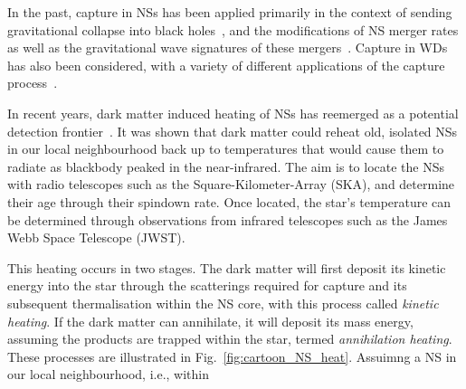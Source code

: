 In the past, capture in NSs has been applied primarily in the context of sending gravitational collapse into black holes~\cite{McDermott:2011jp_ConstraintsScalarAsymmetric,Kouvaris:2011fi_ExcludingLightAsymmetric,Guver:2012ba_may_Capturedarkmatter, Garani:2018kkd_may_NewAnalysisNeutron,Bramante:2013nma_jan_Boundsselfinteractingfermion,Bertoni:2013bsa_dec_DarkMatterThermalization,Bell:2013xk_jun_Realisticneutronstar}, and the modifications of NS merger rates as well as the gravitational wave signatures of these mergers~\cite{Bramante:2017ulk_mar_SearchingDarkMatter, Ellis:2017jgp_jun_SearchDarkMatter, Ellis:2018bkr_jun_DarkMatterEffects,Nelson:2018xtr_jul_Darkhalosneutron}. Capture in WDs has also been considered, with a variety of different applications of the capture process~\cite{Steigerwald:2019efv_dec_DarkMatterThermonuclear, Panotopoulos:2020kuo_jun_Constraintslightdark, McCullough:2010ai_CaptureInelasticDark, Hooper:2010es_InelasticDarkMatter, Bramante:2015cua_sep_Darkmatterignition, Bertone:2007ae_CompactStarsDark}. 

In recent years, dark matter induced heating of NSs has reemerged as a potential detection frontier~\cite{Raj:2017wrv_feb_Neutronstarsdark, Baryakhtar:2017dbj_sep_DarkKineticHeating, Bell:2018pkk_sep_HeatingNeutronStars,Joglekar:2019vzy_sep_Relativisticcapturedark, Acevedo:2019agu_mar_WarmingNuclearPasta, Bell:2019pyc_jun_CaptureLeptophilicDark, Garani:2019fpa_aug_Darkmatterinteractions,Chatterjee:2022dhp_jul_Faintlightold}. It was shown that dark matter could reheat old, isolated NSs in our local neighbourhood back up to temperatures that would cause them to radiate as blackbody peaked in the near-infrared. 
The aim is to locate the NSs with radio telescopes such as the Square-Kilometer-Array (SKA), and determine their age through their spindown rate. 
Once located, the star's temperature can be determined through observations from infrared telescopes such as the James Webb Space Telescope (JWST).

This heating occurs in two stages. The dark matter will first deposit its kinetic energy into the star through the scatterings required for capture and its subsequent thermalisation within the NS core, with this process called \textit{kinetic heating}. If the dark matter can annihilate, it will deposit its mass energy, assuming the products are trapped within the star, termed \textit{annihilation heating}. These processes are illustrated in Fig.~\ref{fig:cartoon_NS_heat}. Assuimng a NS in our local neighbourhood, i.e., within 

